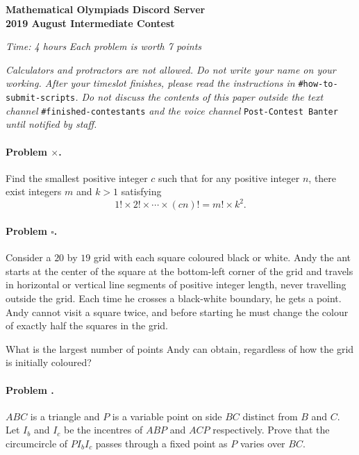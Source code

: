 \documentclass[11pt]{article}
\begin{document}
		\noindent \Large\textbf{Mathematical Olympiads Discord Server}
		\vspace{5pt}\\
		\noindent \huge\textbf{2019 August Intermediate Contest}\\
		\noindent \makebox[\linewidth]{\rule{\textwidth}{0.4pt}}
			
	\normalsize
	
	\begin{flushright}
	\textit{Time: 4 hours} \hfill \textit{Each problem is worth 7 points}
	\end{flushright}
	
	\noindent \textit{Calculators and protractors are not allowed. Do not write your name on your working. After your timeslot finishes, please read the instructions in} \texttt{\#how-to-submit-scripts}\textit{. Do not discuss the contents of this paper outside the text channel }\texttt{\#finished-contestants}\textit{ and the voice channel }\texttt{Post-Contest Banter}\textit{ until notified by staff.}
	
	\paragraph{Problem \large \(\times\).} Find the smallest positive integer \(c\) such that for any positive integer $n$, there exist integers \(m\) and \(k>1\) satisfying \[1! \times 2! \times \cdots \times (cn)! = m! \times k^2.\]
	
	\paragraph{Problem \(\square\).} Consider a \(20\) by \(19\) grid with each square coloured black or white. Andy the ant starts at the center of the square at the bottom-left corner of the grid and travels in horizontal or vertical line segments of positive integer length, never travelling outside the grid. Each time he crosses a black-white boundary, he gets a point. Andy cannot visit a square twice, and before starting he must change the colour of exactly half the squares in the grid.
	
	What is the largest number of points Andy can obtain, regardless of how the grid is initially coloured?

	\paragraph{Problem {\footnotesize \raisebox{1.6pt}{\(\bigcirc\)}}.} \(ABC\) is a triangle and \(P\) is a variable point on side \(BC\) distinct from \(B\) and \(C.\) Let \(I_b\) and \(I_c\) be the incentres of \(ABP\) and \(ACP\) respectively. Prove that the circumcircle of \(PI_bI_c\) passes through a fixed point as \(P\) varies over \(BC.\)
\end{document}
